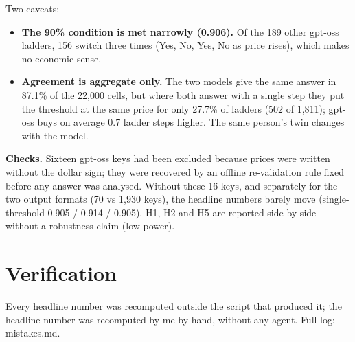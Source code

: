 \documentclass[11pt,a4paper]{article}
\begin{document}
Two caveats:
\begin{itemize}
\item \textbf{The 90\% condition is met narrowly (0.906).} Of the 189 other gpt-oss ladders, 156 switch three times (Yes, No, Yes, No as price rises), which makes no economic sense.
\item \textbf{Agreement is aggregate only.} The two models give the same answer in 87.1\% of the 22,000 cells, but where both answer with a single step they put the threshold at the same price for only 27.7\% of ladders (502 of 1,811); gpt-oss buys on average 0.7 ladder steps higher. The same person's twin changes with the model.
\end{itemize}

\textbf{Checks.} Sixteen gpt-oss keys had been excluded because prices were written without the dollar sign; they were recovered by an offline re-validation rule fixed before any answer was analysed. Without these 16 keys, and separately for the two output formats (70 vs 1,930 keys), the headline numbers barely move (single-threshold 0.905 / 0.914 / 0.905). H1, H2 and H5 are reported side by side without a robustness claim (low power).

\section{Verification}

Every headline number was recomputed outside the script that produced it; the headline number was recomputed by me by hand, without any agent. Full log: mistakes.md.
\end{document}
